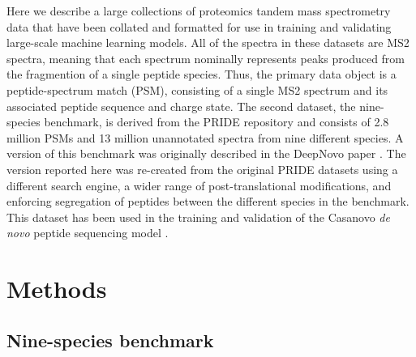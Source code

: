 \documentclass{article}
\begin{document}
Here we describe a large collections of proteomics tandem mass spectrometry data that have been collated and formatted for use in training and validating large-scale machine learning models.  All of the spectra in these datasets are MS2 spectra, meaning that each spectrum nominally represents peaks produced from the fragmention of a single peptide species.  Thus, the primary data object is a peptide-spectrum match (PSM), consisting of a single MS2 spectrum and its associated peptide sequence and charge state.  The second dataset, the nine-species benchmark, is derived from the PRIDE repository and consists of 2.8 million PSMs and 13 million unannotated spectra from nine different species.  A version of this benchmark was originally described in the DeepNovo paper \cite{trans2017denovo}.  The version reported here was re-created from the original PRIDE datasets using a different search engine, a wider range of post-translational modifications, and enforcing segregation of peptides between the different species in the benchmark.  This dataset has been used in the training and validation of the Casanovo \textit{de novo} peptide sequencing model \cite{yilmaz2022denovo}.

\section*{Methods}

\subsection*{Nine-species benchmark}
\end{document}
